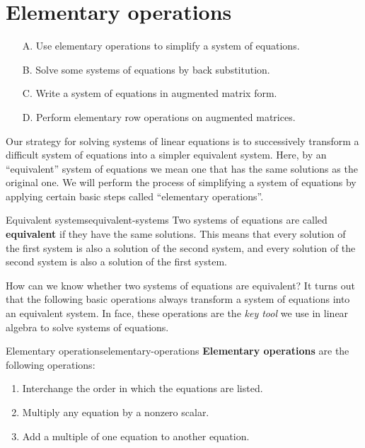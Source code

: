 \section{Elementary operations}

\begin{outcome}
  \begin{enumerate}
  \item[A.] Use elementary operations to simplify a system of
    equations.
  \item[B.] Solve some systems of equations by back substitution.
  \item[C.] Write a system of equations in augmented matrix form.
  \item[D.] Perform elementary row operations on augmented matrices.
  \end{enumerate}
\end{outcome}

Our strategy for solving systems of linear equations is to
successively transform a difficult system of equations into a simpler
equivalent system. Here, by an ``equivalent'' system of equations we
mean one that has the same solutions as the original one. We will
perform the process of simplifying a system of equations by applying
certain basic steps called ``elementary operations''.

\begin{definition}{Equivalent systems}{equivalent-systems}
  Two systems of equations are called
  \textbf{equivalent}
  if they have the same solutions. This means that every solution of
  the first system is also a solution of the second system, and every
  solution of the second system is also a solution of the first system.
\end{definition}

How can we know whether two systems of equations are equivalent? It
turns out that the following basic operations always transform a
system of equations into an equivalent system. In face, these
operations are the {\em key tool} we use in linear algebra to solve
systems of equations.

\begin{definition}{Elementary operations}{elementary-operations}
\textbf{Elementary operations} are the
following operations:

\begin{enumerate}
\item Interchange the order in which the equations are listed.

\item Multiply any equation by a nonzero scalar.

\item Add a multiple of one equation to another equation.
\end{enumerate}
\end{definition}

